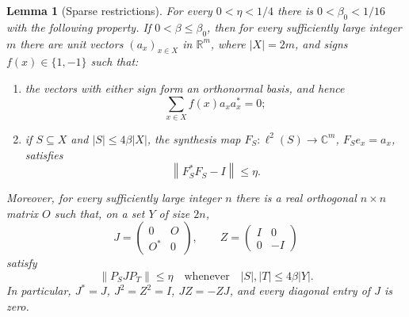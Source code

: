 \documentclass[11pt]{article}
\numberwithin{equation}{section}
\newtheorem{lemma}[theorem]{Lemma}
\theoremstyle{definition}
\theoremstyle{remark}
\newcommand{\norm}[1]{\left\lVert#1\right\rVert}
\newcommand{\id}{I}
\begin{document}
\begin{lemma}[Sparse restrictions]\label{lem:sparse}
For every $0<\eta<1/4$ there is $0<\beta_0<1/16$ with the following property.
If $0<\beta\leq\beta_0$, then for every sufficiently large integer $m$
there are unit vectors $(a_x)_{x\in X}$ in $\mathbb R^m$, where
$|X|=2m$, and signs $f(x)\in\{1,-1\}$ such that:
\begin{enumerate}
\item the vectors with either sign form an orthonormal basis, and hence
\begin{equation}\label{eq:frame-cancellation}
 \sum_{x\in X} f(x)a_xa_x^*=0;
\end{equation}
\item if $S\subseteq X$ and $|S|\leq4\beta|X|$, the synthesis map
$F_S:\ell^2(S)\to\mathbb C^m$, $F_Se_x=a_x$, satisfies
\begin{equation}\label{eq:sparse-gram}
 \norm{F_S^*F_S-\id}\leq\eta.
\end{equation}
\end{enumerate}
Moreover, for every sufficiently large integer $n$ there is a real
orthogonal $n\times n$ matrix $O$ such that, on a set $Y$ of size $2n$,
\begin{equation}\label{eq:JZ}
 J=\begin{pmatrix}0&O\\ O^*&0\end{pmatrix},
 \qquad Z=\begin{pmatrix}\id&0\\0&-\id\end{pmatrix}
\end{equation}
satisfy
\begin{equation}\label{eq:sparse-J}
 \norm{P_SJP_T}\leq\eta
 \quad\text{whenever}\quad |S|,|T|\leq4\beta|Y|.
\end{equation}
In particular, $J^*=J$, $J^2=Z^2=\id$, $JZ=-ZJ$, and every diagonal
entry of $J$ is zero.
\end{lemma}
\end{document}
